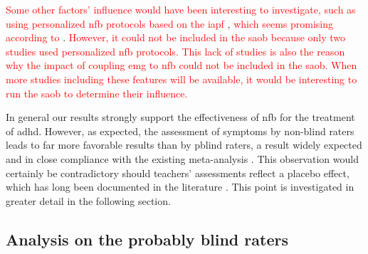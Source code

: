 \textcolor{red}{Some other factors' influence would have been interesting to investigate, such as using personalized \gls{nfb} protocols based on the 
\gls{iapf}} \citep{Liu2016}, \textcolor{red}{which seems promising according to} \citet{Bazanova2018, Escolano2014}. \textcolor{red}{However, it could not be included in the 
\gls{saob} because only two studies used personalized \gls{nfb} protocols. This lack of studies is also the reason why the impact of coupling \gls{emg} to \gls{nfb} could not be 
included in the \gls{saob}. When more studies including these features will be available, it would be interesting to run the \gls{saob} to determine their influence.} 

In general our results strongly support the effectiveness of \gls{nfb} for the treatment of \gls{adhd}. However, as expected, 
the assessment of symptoms by non-blind raters leads to far more favorable results than by \gls{pblind} raters, a result 
widely expected and in close compliance with the existing meta-analysis \citep{Cortese2016, Micoulaud2014}. 
This observation would certainly be contradictory should teachers’ 
assessments reflect a placebo effect, which has long been documented in the literature \citep{Sollie2013, Narad2015, Minder2018}. 
This point is investigated in greater detail in the following section.

\subsection{Analysis on the probably blind raters}

